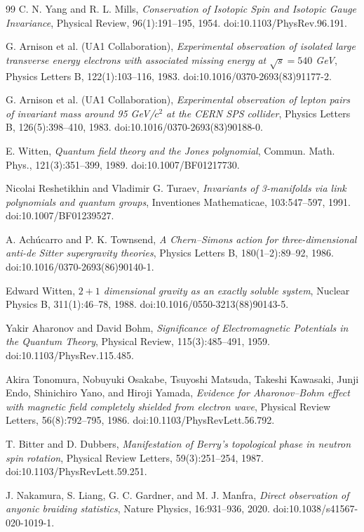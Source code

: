 \documentclass{article}
\begin{document}
\begin{thebibliography}{99}
C. N. Yang and R. L. Mills,
\textit{Conservation of Isotopic Spin and Isotopic Gauge Invariance},
Physical Review, 96(1):191--195, 1954.
doi:10.1103/PhysRev.96.191.

G. Arnison et al. (UA1 Collaboration),
\textit{Experimental observation of isolated large transverse energy
electrons with associated missing energy at $\sqrt{s}=540$ GeV},
Physics Letters B, 122(1):103--116, 1983.
doi:10.1016/0370-2693(83)91177-2.

G. Arnison et al. (UA1 Collaboration),
\textit{Experimental observation of lepton pairs of invariant mass around
95 GeV/$c^2$ at the CERN SPS collider},
Physics Letters B, 126(5):398--410, 1983.
doi:10.1016/0370-2693(83)90188-0.

E. Witten,
\textit{Quantum field theory and the Jones polynomial},
Commun. Math. Phys., 121(3):351--399, 1989.
doi:10.1007/BF01217730.

Nicolai Reshetikhin and Vladimir G. Turaev,
\textit{Invariants of 3-manifolds via link polynomials and quantum groups},
Inventiones Mathematicae, 103:547--597, 1991.
doi:10.1007/BF01239527.

A. Ach\'ucarro and P. K. Townsend,
\textit{A Chern--Simons action for three-dimensional anti-de Sitter supergravity theories},
Physics Letters B, 180(1--2):89--92, 1986.
doi:10.1016/0370-2693(86)90140-1.

Edward Witten,
\textit{$2+1$ dimensional gravity as an exactly soluble system},
Nuclear Physics B, 311(1):46--78, 1988.
doi:10.1016/0550-3213(88)90143-5.

Yakir Aharonov and David Bohm,
\textit{Significance of Electromagnetic Potentials in the Quantum Theory},
Physical Review, 115(3):485--491, 1959.
doi:10.1103/PhysRev.115.485.

Akira Tonomura, Nobuyuki Osakabe, Tsuyoshi Matsuda, Takeshi Kawasaki,
Junji Endo, Shinichiro Yano, and Hiroji Yamada,
\textit{Evidence for Aharonov--Bohm effect with magnetic field completely
shielded from electron wave},
Physical Review Letters, 56(8):792--795, 1986.
doi:10.1103/PhysRevLett.56.792.

T. Bitter and D. Dubbers,
\textit{Manifestation of Berry's topological phase in neutron spin rotation},
Physical Review Letters, 59(3):251--254, 1987.
doi:10.1103/PhysRevLett.59.251.

J. Nakamura, S. Liang, G. C. Gardner, and M. J. Manfra,
\textit{Direct observation of anyonic braiding statistics},
Nature Physics, 16:931--936, 2020.
doi:10.1038/s41567-020-1019-1.

\end{thebibliography}
\end{document}
